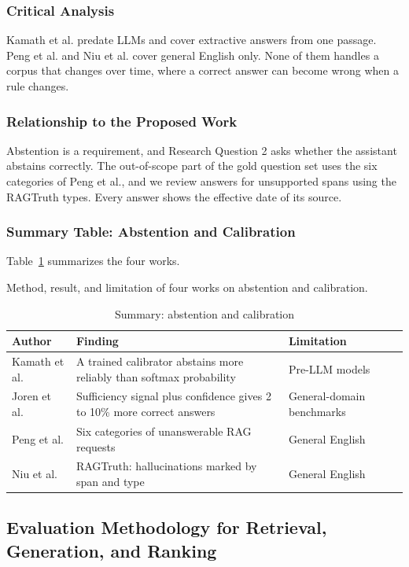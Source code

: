 \documentclass{FastFyp}
\makeatletter
\newcommand{\capdesc}[1]{%
  \par\nobreak
  \begingroup
  \setstretch{1}%
  \ifdefstring{\@captype}{figure}%
    {\vspace{0.2\baselineskip}}%
    {\vspace{-0.8\baselineskip}}%
  {\centering\normalfont\itshape\small
   \begin{minipage}{0.92\textwidth}\centering #1\end{minipage}\par}%
  \endgroup
  \vspace{0.4\baselineskip}%
}
\makeatother
\begin{document}
\subsubsection{Critical Analysis}
Kamath et al. predate LLMs and cover extractive answers from one passage. Peng et al. and Niu et al. cover general English only. None of them handles a corpus that changes over time, where a correct answer can become wrong when a rule changes.

\subsubsection{Relationship to the Proposed Work}
Abstention is a requirement, and Research Question 2 asks whether the assistant abstains correctly. The out-of-scope part of the gold question set uses the six categories of Peng et al., and we review answers for unsupported spans using the RAGTruth types. Every answer shows the effective date of its source.

\subsubsection{Summary Table: Abstention and Calibration}
Table~\ref{tab:lr-abstention} summarizes the four works.
\begin{table}[!ht]
\centering
\caption{Summary: abstention and calibration}
\capdesc{Method, result, and limitation of four works on abstention and calibration.}
\begin{tabular}{|p{3.0cm}|p{4.0cm}|p{2.8cm}|p{4.0cm}|}
\hline
\textbf{Author} & \textbf{Finding} & \textbf{Limitation} \\
\hline
Kamath et al. \cite{ref:kamath2020selective} & A trained calibrator abstains more reliably than softmax probability & Pre-LLM models \\
\hline
Joren et al. \cite{ref:joren2025sufficient} & Sufficiency signal plus confidence gives 2 to 10\% more correct answers & General-domain benchmarks \\
\hline
Peng et al. \cite{ref:peng2025unanswerability} & Six categories of unanswerable RAG requests & General English \\
\hline
Niu et al. \cite{ref:niu2024ragtruth} & RAGTruth: hallucinations marked by span and type & General English \\
\hline
\end{tabular}
\label{tab:lr-abstention}
\end{table}

\subsection{Evaluation Methodology for Retrieval, Generation, and Ranking}\label{sec:lr-eval}
\end{document}
